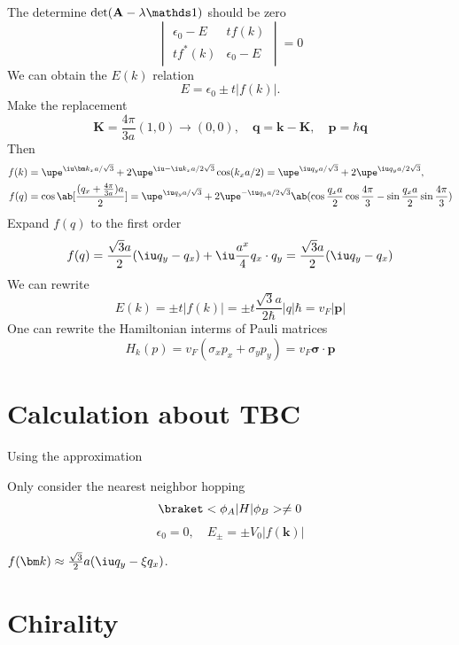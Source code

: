 The determine $\det(\mathbf A - \lambda\identity)$ should be zero
\[
  \begin{vmatrix}
    \epsilon_0 - E & tf(k)\\
    tf^*(k) & \epsilon_0 - E
  \end{vmatrix} = 0
\]
We can obtain the $E(k)$ relation
\begin{equation}
  E = \epsilon_0 \pm t|f(k)|.
\end{equation}
Make the replacement
\[
  \bm K = \frac{4\pi}{3a}(1,0) \to (0,0), \quad \bm q = \bm k - \bm K, \quad
  \bm p = \hbar\bm q
\]
Then
\begin{align}
  f(k) & = \upe^{\iu\bm k_xa/\sqrt3}
       + 2\upe^{\iu-\iu k_xa/2\sqrt3}\cos(k_xa/2)
= \upe^{\iu q_ya/\sqrt3} + 2\upe^{\iu q_ya/2\sqrt3},\\
  f(q) & = \cos\ab[\frac{(q_x + \frac{4\pi}{3a})a}{2}]
= \upe^{\iu q_ya/\sqrt3} + 2\upe^{-\iu q_ya/2\sqrt3}
  \ab(\cos\frac{q_xa}{2} \cos\frac{4\pi}{3} - \sin\frac{q_xa}{2} \sin\frac{4\pi}{3})
\end{align}
Expand $f(q)$ to the first order
\begin{equation}
  f(q) = \frac{\sqrt3a}{2} (\iu q_y - q_x) + \iu \frac{a^x}{4} q_x \cdot q_y
= \frac{\sqrt3a}{2}(\iu q_y - q_x)
\end{equation}
We can rewrite
\[
  E(k) = \pm t|f(k)| = \pm t\frac{\sqrt3a}{2\hbar} |q|\hbar = v_F |\bm p|
\]
One can rewrite the Hamiltonian interms of Pauli matrices
\begin{equation}
  H_k(p) = v_F(\sigma_x p_x + \sigma_y p_y) = v_F \bm \sigma \cdot \bm p
\end{equation}

\section{Calculation about TBC}

Using the approximation
\begin{enumext}
  \item Only consider the nearest neighbor hopping
  \[
    \braket<\phi_A|H|\phi_B> \neq 0
  \]
  \[
    \epsilon_0 = 0, \quad E_\pm = \pm V_0|f(\bm k)|
  \]
  \item $f(\bm k) \approx \frac{\sqrt3}{2} a(\iu q_y - \xi q_x)$.
\end{enumext}

\section{Chirality}

